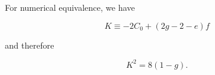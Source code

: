 For numerical equivalence, we have

$$K \equiv -2C_0 + (2g - 2 - e)f$$

and therefore

$$K^2 = 8(1 - g).$$
